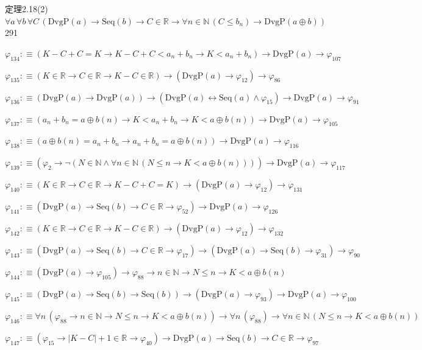 \begin{fullproof}{定理2.18(2)}{$\forall a\,\forall b\,\forall C\,(\mathrm{DvgP}(a) \to \mathrm{Seq}(b) \to C \in \mathbb{R} \to \forall n \in \mathbb{N}\,(C \leq b_{n}) \to \mathrm{DvgP}(a \oplus b))$}{291}
\begin{abbrevlist}
\item $\varphi_{134} :\equiv (K - C + C = K \to K - C + C < a_{n} + b_{n} \to K < a_{n} + b_{n}) \to \mathrm{DvgP}(a) \to \varphi_{107}$
\item $\varphi_{135} :\equiv (K \in \mathbb{R} \to C \in \mathbb{R} \to K - C \in \mathbb{R}) \to (\mathrm{DvgP}(a) \to \varphi_{12}) \to \varphi_{86}$
\item $\varphi_{136} :\equiv (\mathrm{DvgP}(a) \to \mathrm{DvgP}(a)) \to (\mathrm{DvgP}(a) \leftrightarrow \mathrm{Seq}(a) \land \varphi_{15}) \to \mathrm{DvgP}(a) \to \varphi_{91}$
\item $\varphi_{137} :\equiv (a_{n} + b_{n} = a \oplus b(n) \to K < a_{n} + b_{n} \to K < a \oplus b(n)) \to \mathrm{DvgP}(a) \to \varphi_{105}$
\item $\varphi_{138} :\equiv (a \oplus b(n) = a_{n} + b_{n} \to a_{n} + b_{n} = a \oplus b(n)) \to \mathrm{DvgP}(a) \to \varphi_{116}$
\item $\varphi_{139} :\equiv (\varphi_{2} \to \neg (N \in \mathbb{N} \land \forall n \in \mathbb{N}\,(N \leq n \to K < a \oplus b(n)))) \to \mathrm{DvgP}(a) \to \varphi_{117}$
\item $\varphi_{140} :\equiv (K \in \mathbb{R} \to C \in \mathbb{R} \to K - C + C = K) \to (\mathrm{DvgP}(a) \to \varphi_{12}) \to \varphi_{131}$
\item $\varphi_{141} :\equiv (\mathrm{DvgP}(a) \to \mathrm{Seq}(b) \to C \in \mathbb{R} \to \varphi_{52}) \to \mathrm{DvgP}(a) \to \varphi_{126}$
\item $\varphi_{142} :\equiv (K \in \mathbb{R} \to C \in \mathbb{R} \to K - C \in \mathbb{R}) \to (\mathrm{DvgP}(a) \to \varphi_{12}) \to \varphi_{132}$
\item $\varphi_{143} :\equiv (\mathrm{DvgP}(a) \to \mathrm{Seq}(b) \to C \in \mathbb{R} \to \varphi_{17}) \to (\mathrm{DvgP}(a) \to \mathrm{Seq}(b) \to \varphi_{31}) \to \varphi_{90}$
\item $\varphi_{144} :\equiv (\mathrm{DvgP}(a) \to \varphi_{105}) \to \varphi_{88} \to n \in \mathbb{N} \to N \leq n \to K < a \oplus b(n)$
\item $\varphi_{145} :\equiv (\mathrm{DvgP}(a) \to \mathrm{Seq}(b) \to \mathrm{Seq}(b)) \to (\mathrm{DvgP}(a) \to \varphi_{93}) \to \mathrm{DvgP}(a) \to \varphi_{100}$
\item $\varphi_{146} :\equiv \forall n\,(\varphi_{88} \to n \in \mathbb{N} \to N \leq n \to K < a \oplus b(n)) \to \forall n\,(\varphi_{88}) \to \forall n \in \mathbb{N}\,(N \leq n \to K < a \oplus b(n))$
\item $\varphi_{147} :\equiv (\varphi_{15} \to \lvert K - C \rvert + 1 \in \mathbb{R} \to \varphi_{40}) \to \mathrm{DvgP}(a) \to \mathrm{Seq}(b) \to C \in \mathbb{R} \to \varphi_{97}$

\end{abbrevlist}
\end{fullproof}
